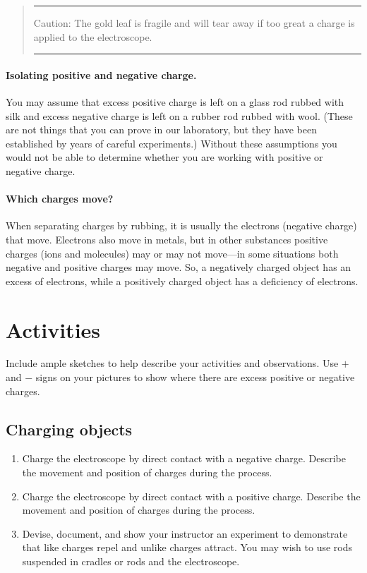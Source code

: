 \begin{quote} \hrule 
\textsf{Caution:} The gold leaf is fragile and will tear away if too great a charge is applied to the electroscope.
\vspace{7pt}
\hrule 
\end{quote}
\paragraph{Isolating positive and negative charge.}  You may assume that excess positive charge is left on a glass rod rubbed with silk and excess negative charge is left on a rubber rod rubbed with wool.  (These are not things that you can prove in our laboratory, but they have been established by years of careful experiments.)  Without these assumptions you would not be able to determine whether you are working with positive or negative charge.

\paragraph{Which charges move?}  When separating charges by rubbing, it is usually the electrons (negative charge) that move.  Electrons also move in metals, but in other substances positive charges (ions and molecules) may or may not move---in some situations both negative and positive charges may move. So, a negatively charged object has an excess of electrons, while a positively charged object has a deficiency of electrons.

\section{Activities}
Include ample sketches to help describe your activities and observations. Use $+$ and $-$ signs on your pictures to show where there are excess positive or negative charges.

\subsection{Charging objects}
\begin{enumerate}
	 \item Charge the electroscope by direct contact with a negative charge.  Describe the movement and position of charges during the process.
	 \item Charge the electroscope by direct contact with a positive charge.  Describe the movement and position of charges during the process.
	 \item  Devise, document, and show your instructor an experiment to demonstrate that like charges repel and unlike charges attract.  You may wish to use rods suspended in cradles or rods and the electroscope.
\end{enumerate}

